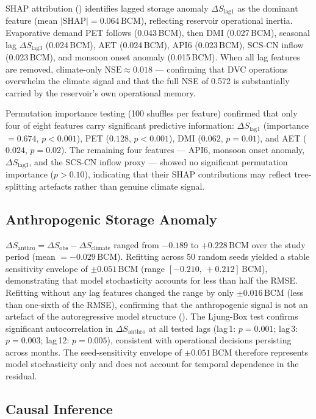 \documentclass[preprint,12pt,authoryear]{elsarticle}
\newcommand{\dS}{\Delta S}
\newcommand{\dSobs}{\Delta S_{\mathrm{obs}}}
\newcommand{\dSclim}{\Delta S_{\mathrm{climate}}}
\newcommand{\dSanthro}{\Delta S_{\mathrm{anthro}}}
\newcommand{\BCM}{\,\mathrm{BCM}}
\newcommand{\NSE}{\mathrm{NSE}}
\begin{document}
SHAP attribution () identifies lagged storage anomaly
$\dS_{\text{lag1}}$ as the dominant feature (mean $|\text{SHAP}| = 0.064\BCM$),
reflecting reservoir operational inertia. Evaporative demand PET follows
(0.043\,BCM), then DMI (0.027\,BCM), seasonal lag $\dS_{\text{lag3}}$
(0.024\,BCM), AET (0.024\,BCM), API6 (0.023\,BCM), SCS-CN inflow
(0.023\,BCM), and monsoon onset anomaly (0.015\,BCM). When all lag features
are removed, climate-only $\NSE \approx 0.018$ --- confirming that DVC
operations overwhelm the climate signal and that the full NSE of 0.572 is
substantially carried by the reservoir's own operational memory.

Permutation importance testing (100 shuffles per feature) confirmed that only
four of eight features carry significant predictive information:
$\dS_{\text{lag1}}$ (importance $= 0.674$, $p < 0.001$), PET ($0.128$,
$p < 0.001$), DMI ($0.062$, $p = 0.01$), and AET ($0.024$, $p = 0.02$).
The remaining four features --- API6, monsoon onset anomaly,
$\dS_{\text{lag3}}$, and the SCS-CN inflow proxy --- showed no significant
permutation importance ($p > 0.10$), indicating that their SHAP contributions
may reflect tree-splitting artefacts rather than genuine climate signal.

\subsection{Anthropogenic Storage Anomaly}
\label{sec:res_anthro}

$\dSanthro = \dSobs - \dSclim$ ranged from $-0.189$ to $+0.228\BCM$ over
the study period (mean $= -0.029\BCM$). Refitting across 50
random seeds yielded a stable sensitivity envelope of $\pm 0.051\BCM$ (range
$[-0.210,\,+0.212]\BCM$), demonstrating that model stochasticity accounts
for less than half the RMSE. Refitting without any lag features changed the
range by only $\pm 0.016\BCM$ (less than one-sixth of the RMSE), confirming
that the anthropogenic signal is not an artefact of the autoregressive model
structure (). The Ljung-Box test confirms significant
autocorrelation in $\dSanthro$ at all tested lags (lag\,1: $p = 0.001$;
lag\,3: $p = 0.003$; lag\,12: $p = 0.005$), consistent with operational
decisions persisting across months. The seed-sensitivity envelope of
$\pm 0.051\BCM$ therefore represents model stochasticity only and does not
account for temporal dependence in the residual.

\subsection{Causal Inference}
\label{sec:res_causal}
\end{document}
